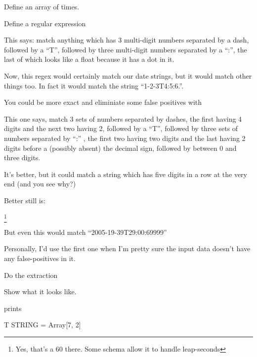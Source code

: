   Define an array of times.


Define a regular expression



This says: match anything which has 3 multi-digit numbers separated by a dash, followed by a ``T'', followed by three multi-digit numbers separated by a ``:'', the last of which looks like a float because it has a dot in it.

Now, this regex would certainly match our date strings, but it would
  match other things too. In fact it would match the string
  ``1-2-3T4:5:6.''. 

  You could be more exact and eliminiate some false positives with 



  This one says, match 3 sets of numbers separated by dashes, the
  first having 4 digits and the next two having 2, followed by a
  ``T'', followed by three sets of numbers separated by ``:'' , the
  first two having two digits and the last having 2 digits before a
  (possibly absent) the decimal sign, followed by between 0 and three
  digits. 

  It's better, but it could match a string which has five digits in a
  row at the very end (and you see why?)


Better still is:

  \footnote{Yes, that's a 60 there. Some schema allow it to handle leap-seconds}

But even this would match ``2005-19-39T29:00:69999''

Personally, I'd use the first one when I'm pretty sure the input data
doesn't have any false-positives in it.

Do the extraction


Show what it looks like.


prints 

T               STRING    = Array[7, 2]


